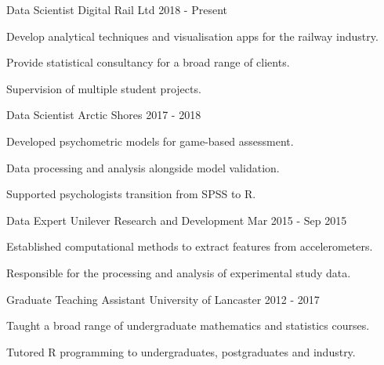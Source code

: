 \begin{cventries}
      
    \cventry
    {Data Scientist}
    {Digital Rail Ltd}
    {}
    {2018 - Present}
    {
      \begin{cvitems}
        \item Develop analytical techniques and visualisation apps for the railway industry.
        \item Provide statistical consultancy for a broad range of clients.
        \item Supervision of multiple student projects.
      \end{cvitems}
    }  
      
     \cventry
    {Data Scientist}
    {Arctic Shores}
    {}
    {2017 - 2018}
    {
      \begin{cvitems}
        \item Developed psychometric models for game-based assessment.
         \item Data processing and analysis alongside model validation.
         \item Supported psychologists transition from SPSS to R.
      \end{cvitems}
    }

  \cventry
    {Data Expert}
    {Unilever Research and Development}
    {}
    {Mar 2015 - Sep 2015}
    {
      \begin{cvitems}
        \item Established computational methods to extract features from accelerometers.
        \item Responsible for the processing and analysis of experimental study data.
      \end{cvitems}
    }
    
    \cventry
    {Graduate Teaching Assistant}
    {University of Lancaster}
    {}
    {2012 - 2017}
    {
      \begin{cvitems}
        \item Taught a broad range of undergraduate mathematics and statistics courses.
         \item Tutored R programming to undergraduates, postgraduates and industry.
      \end{cvitems}
    }
\end{cventries}
